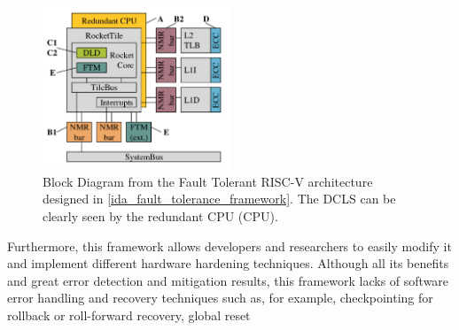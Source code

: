\documentclass[10pt, a4paper]{report}
\begin{document}
\begin{figure}[h!]
    \begin{center}
        \includegraphics[width=0.5\textwidth]{ida_fault_tolerance_arch.png}
        \caption{Block Diagram from the Fault Tolerant RISC-V architecture
        designed in \ref{ida_fault_tolerance_framework}. The \acrshort{DCLS} can
    be clearly seen by the redundant \acrlong{CPU} (\acrshort{CPU}).}
        \label{ida_fault_tolerance_arch}
    \end{center}
\end{figure}

Furthermore, this framework allows developers and researchers to easily modify 
it and implement different hardware hardening techniques. Although all its benefits
and great error detection and mitigation results, this framework lacks of
software error handling and recovery techniques such as, for example,
checkpointing for rollback or roll-forward recovery, global reset 

\newpage

\glsaddall
\printnoidxglossary[type=\acronymtype,title={Abreviaturas}]
\end{document}
